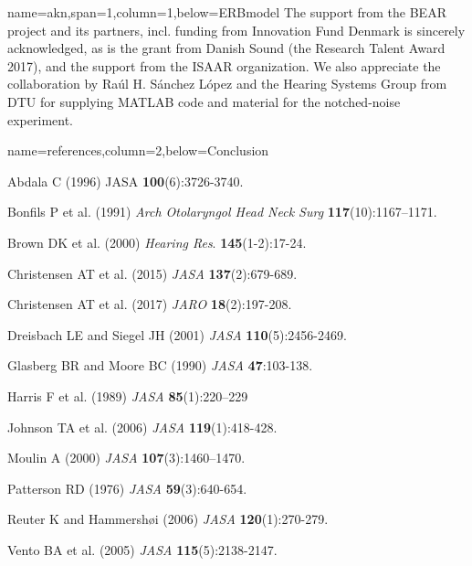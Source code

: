 \documentclass[paperwidth=100cm,paperheight=160cm,portrait,fontscale=0.2941]{baposter}
\begin{document}
\begin{poster}
{}

{name=akn,span=1,column=1,below=ERBmodel}
{\parskip 5pt
The support from the BEAR project and its partners, incl. funding from Innovation Fund Denmark is sincerely acknowledged, as is the grant from Danish Sound (the Research Talent Award 2017), and the support from the ISAAR organization. We also appreciate the collaboration by Raúl H. Sánchez López and the Hearing Systems Group from DTU for supplying MATLAB code and material for the notched-noise experiment.
}


{name=references,column=2,below=Conclusion}
{
\renewcommand{\section}[2]{}%
\footnotesize
Abdala C (1996) JASA \textbf{100}(6):3726-3740.

Bonfils P et al. (1991) \textit{Arch Otolaryngol Head Neck Surg} \textbf{117}(10):1167–1171.

Brown DK et al. (2000) \textit{Hearing Res}. \textbf{145}(1-2):17-24.

Christensen AT et al. (2015) \textit{JASA} \textbf{137}(2):679-689.

Christensen AT et al. (2017) \textit{JARO} \textbf{18}(2):197-208.

Dreisbach LE and Siegel JH (2001) \textit{JASA} \textbf{110}(5):2456-2469.

Glasberg BR and Moore BC (1990) \textit{JASA} \textbf{47}:103-138.

Harris F et al. (1989) \textit{JASA} \textbf{85}(1):220–229

Johnson TA et al. (2006) \textit{JASA} \textbf{119}(1):418-428.

Moulin A (2000) \textit{JASA} \textbf{107}(3):1460–1470.

Patterson RD (1976) \textit{JASA} \textbf{59}(3):640-654.

Reuter K and Hammershøi (2006) \textit{JASA} \textbf{120}(1):270-279.

Vento BA et al. (2005) \textit{JASA} \textbf{115}(5):2138-2147.

}



\end{poster}
\end{document}
